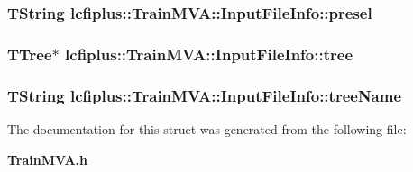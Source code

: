 \subsubsection[{presel}]{\setlength{\rightskip}{0pt plus 5cm}T\-String lcfiplus\-::\-Train\-M\-V\-A\-::\-Input\-File\-Info\-::presel}\label{structlcfiplus_1_1TrainMVA_1_1InputFileInfo_a104bfda25b056897ecfc8f0239398eb6}
\subsubsection[{tree}]{\setlength{\rightskip}{0pt plus 5cm}T\-Tree$\ast$ lcfiplus\-::\-Train\-M\-V\-A\-::\-Input\-File\-Info\-::tree}\label{structlcfiplus_1_1TrainMVA_1_1InputFileInfo_a9fbfe4ee55b444eb252882ef9bebc432}
\subsubsection[{tree\-Name}]{\setlength{\rightskip}{0pt plus 5cm}T\-String lcfiplus\-::\-Train\-M\-V\-A\-::\-Input\-File\-Info\-::tree\-Name}\label{structlcfiplus_1_1TrainMVA_1_1InputFileInfo_a802293cada87958e6391cc0888a6e7a3}


The documentation for this struct was generated from the following file\-:\begin{DoxyCompactItemize}
\item 
{\bf Train\-M\-V\-A.\-h}\end{DoxyCompactItemize}
